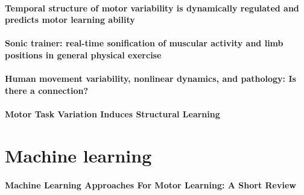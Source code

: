 \documentclass[11pt]{article}
\begin{document}
\paragraph{Temporal structure of motor variability is dynamically regulated and predicts motor learning ability} \citep{wu_temporal_2014}

\paragraph{Sonic trainer: real-time sonification of muscular activity and limb positions in general physical exercise} \citep{yang_sonic_2013}

\paragraph{Human movement variability, nonlinear dynamics, and pathology: Is there a connection?} \citep{stergiou_human_2011}

\paragraph{Motor Task Variation Induces Structural Learning} \citep{braun_motor_2009}



\section{Machine learning}

\paragraph{Machine Learning Approaches For Motor Learning: A Short Review} \citep{caramiaux_machine_2020}
\end{document}

